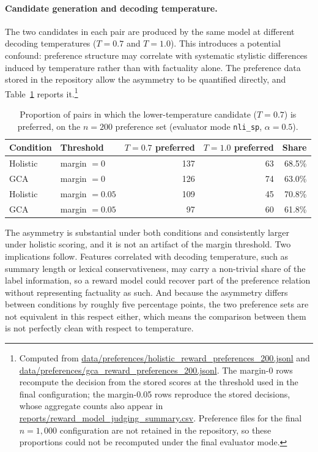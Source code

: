\paragraph{Candidate generation and decoding temperature.} The two candidates in
each pair are produced by the same model at different decoding temperatures
($T=0.7$ and $T=1.0$). This introduces a potential confound: preference structure
may correlate with systematic stylistic differences induced by temperature rather
than with factuality alone. The preference data stored in the repository allow the
asymmetry to be quantified directly, and Table~\ref{tab:temperature-asymmetry}
reports it.\footnote{Computed from
\url{data/preferences/holistic_reward_preferences_200.jsonl} and
\url{data/preferences/gca_reward_preferences_200.jsonl}. The margin-0 rows
recompute the decision from the stored scores at the threshold used in the final
configuration; the margin-0.05 rows reproduce the stored decisions, whose
aggregate counts also appear in
\url{reports/reward_model_judging_summary.csv}. Preference files for the final
$n=1{,}000$ configuration are not retained in the repository, so these proportions
could not be recomputed under the final evaluator mode.}

\begin{table}[htbp]
\centering
\caption[Decoding-temperature asymmetry in the preference labels]{Proportion of pairs in which the lower-temperature candidate ($T=0.7$)
is preferred, on the $n=200$ preference set (evaluator mode \texttt{nli\_sp},
$\alpha=0.5$).}
\label{tab:temperature-asymmetry}
\begin{tabular}{llrrr}
\toprule
Condition & Threshold & $T{=}0.7$ preferred & $T{=}1.0$ preferred & Share \\
\midrule
Holistic & margin $=0$    & 137 & 63 & 68.5\% \\
GCA      & margin $=0$    & 126 & 74 & 63.0\% \\
\addlinespace
Holistic & margin $=0.05$ & 109 & 45 & 70.8\% \\
GCA      & margin $=0.05$ &  97 & 60 & 61.8\% \\
\bottomrule
\end{tabular}
\end{table}

The asymmetry is substantial under both conditions and consistently larger under
holistic scoring, and it is not an artifact of the margin threshold. Two
implications follow. Features correlated with decoding temperature, such as
summary length or lexical conservativeness, may carry a non-trivial share of the
label information, so a reward model could recover part of the preference relation
without representing factuality as such. And because the asymmetry differs between
conditions by roughly five percentage points, the two preference sets are not
equivalent in this respect either, which means the comparison between them is not
perfectly clean with respect to temperature.

